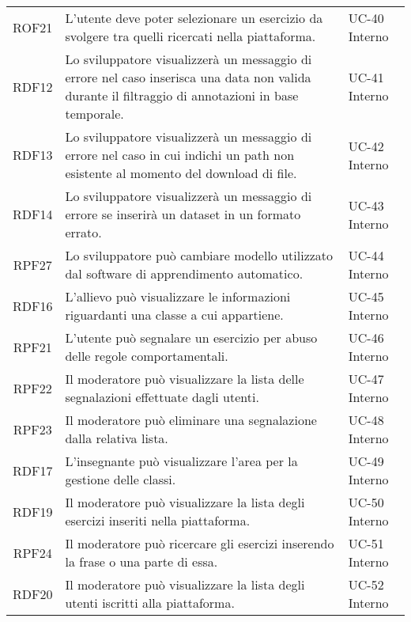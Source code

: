 \begin{tabularx}{\textwidth}{| c | p{10cm} | X |}
		ROF21 & L'utente deve poter selezionare un esercizio da svolgere tra quelli ricercati nella piattaforma. & UC-40 \newline Interno\\
		RDF12 & Lo sviluppatore visualizzerà un messaggio di errore nel caso inserisca una data non valida durante il filtraggio di annotazioni in base temporale. & UC-41 \newline Interno\\
		RDF13 & Lo sviluppatore visualizzerà un messaggio di errore nel caso in cui indichi un path non esistente al momento del download di file. & UC-42 \newline Interno\\
		RDF14 & Lo sviluppatore visualizzerà un messaggio di errore se inserirà un dataset in un formato errato. & UC-43 \newline Interno\\
		RPF27 & Lo sviluppatore può cambiare modello utilizzato dal software di apprendimento automatico. & UC-44 \newline Interno\\
		RDF16 & L'allievo può visualizzare le informazioni riguardanti una classe a cui appartiene. & UC-45 \newline Interno\\
		RPF21 & L'utente può segnalare un esercizio per abuso delle regole comportamentali. & UC-46 \newline Interno\\
		RPF22 & Il moderatore può visualizzare la lista delle segnalazioni effettuate dagli utenti. & UC-47 \newline Interno\\
		RPF23 & Il moderatore può eliminare una segnalazione dalla relativa lista. & UC-48 \newline Interno\\
		RDF17 & L'insegnante può visualizzare l'area per la gestione delle classi. & UC-49 \newline Interno\\
		RDF19 & Il moderatore può visualizzare la lista degli esercizi inseriti nella piattaforma. & UC-50 \newline Interno\\
		RPF24 & Il moderatore può ricercare gli esercizi inserendo la frase o una parte di essa. & UC-51 \newline Interno\\
		RDF20 & Il moderatore può visualizzare la lista degli utenti iscritti alla piattaforma. & UC-52 \newline Interno\\

\end{tabularx}
